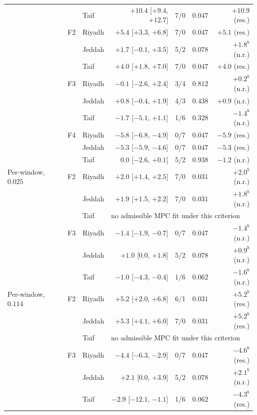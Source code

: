 \begin{table}[!ht]
\begin{tabularx}{\textwidth}{@{}llXrrrr@{}}
 &  & Taif & $+10.4$ [$+9.4$, $+12.7$] & 7/0 & $0.047$ & $+10.9$ (res.) \\
 & F2 & Riyadh & $+5.4$ [$+3.3$, $+6.8$] & 7/0 & $0.047$ & $+5.1$ (res.) \\
 &  & Jeddah & $+1.7$ [$-0.1$, $+3.5$] & 5/2 & $0.078$ & $+1.8^{b}$ (n.r.) \\
 &  & Taif & $+4.0$ [$+1.8$, $+7.0$] & 7/0 & $0.047$ & $+4.0$ (res.) \\
 & F3 & Riyadh & $-0.1$ [$-2.6$, $+2.4$] & 3/4 & $0.812$ & $+0.2^{b}$ (n.r.) \\
 &  & Jeddah & $+0.8$ [$-0.4$, $+1.9$] & 4/3 & $0.438$ & $+0.9$ (n.r.) \\
 &  & Taif & $-1.7$ [$-5.1$, $+1.1$] & 1/6 & $0.328$ & $-1.4^{b}$ (n.r.) \\
 & F4 & Riyadh & $-5.8$ [$-6.8$, $-4.9$] & 0/7 & $0.047$ & $-5.9$ (res.) \\
 &  & Jeddah & $-5.3$ [$-5.9$, $-4.6$] & 0/7 & $0.047$ & $-5.3$ (res.) \\
 &  & Taif & $0.0$ [$-2.6$, $+0.1$] & 5/2 & $0.938$ & $-1.2$ (n.r.) \\
Per-window, $0.025$ & F2 & Riyadh & $+2.0$ [$+1.4$, $+2.5$] & 7/0 & $0.031$ & $+2.0^{b}$ (n.r.) \\
 &  & Jeddah & $+1.9$ [$+1.5$, $+2.2$] & 7/0 & $0.031$ & $+1.8^{b}$ (n.r.) \\
 &  & Taif & \multicolumn{4}{l}{no admissible MPC fit under this criterion} \\
 & F3 & Riyadh & $-1.4$ [$-1.9$, $-0.7$] & 0/7 & $0.047$ & $-1.4^{b}$ (n.r.) \\
 &  & Jeddah & $+1.0$ [$0.0$, $+1.8$] & 5/2 & $0.078$ & $+0.9^{b}$ (n.r.) \\
 &  & Taif & $-1.0$ [$-4.3$, $-0.4$] & 1/6 & $0.062$ & $-1.6^{b}$ (n.r.) \\
Per-window, $0.114$ & F2 & Riyadh & $+5.2$ [$+2.0$, $+6.8$] & 6/1 & $0.031$ & $+5.2^{b}$ (res.) \\
 &  & Jeddah & $+5.3$ [$+4.1$, $+6.0$] & 7/0 & $0.031$ & $+5.2^{b}$ (res.) \\
 &  & Taif & \multicolumn{4}{l}{no admissible MPC fit under this criterion} \\
 & F3 & Riyadh & $-4.4$ [$-6.3$, $-2.9$] & 0/7 & $0.047$ & $-4.6^{b}$ (res.) \\
 &  & Jeddah & $+2.1$ [$0.0$, $+3.9$] & 5/2 & $0.078$ & $+2.1^{b}$ (n.r.) \\
 &  & Taif & $-2.9$ [$-12.1$, $-1.1$] & 1/6 & $0.062$ & $-4.3^{b}$ (res.) \\

\end{tabularx}
\end{table}
